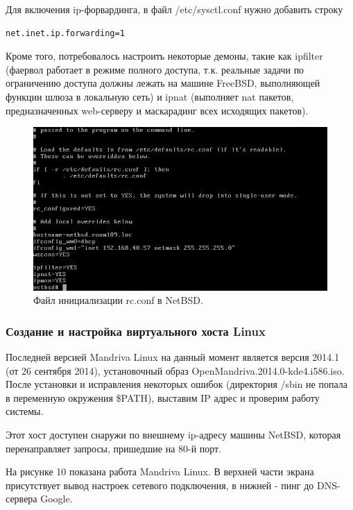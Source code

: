 Для включения ip-форвардинга, в файл /etc/sysctl.conf нужно добавить строку
\begin{Verbatim}[frame=single]
net.inet.ip.forwarding=1
\end{Verbatim}

Кроме того, потребовалось настроить некоторые демоны, такие как ipfilter (фаервол работает в режиме полного доступа, т.к. реальные задачи по ограничению доступа должны лежать на машине FreeBSD, выполняющей функции шлюза в локальную сеть) и ipnat (выполняет nat пакетов, предназначенных web-серверу и маскарадинг всех исходящих пакетов).

\begin{figure}[h!]
\centering
\includegraphics[scale=0.9]{res/netbsd-rcconf}
\caption{Файл инициализации rc.conf в NetBSD.}
\end{figure}

\subsubsection{Создание и настройка виртуального хоста Linux}

Последней версией Mandriva Linux на данный момент является версия 2014.1 (от 26 сентября 2014), установочный образ OpenMandriva.2014.0-kde4.i586.iso. После установки и исправления некоторых ошибок (директория /sbin не попала в переменную окружения \$PATH), выставим IP адрес и проверим работу системы.

Этот хост доступен снаружи по внешнему ip-адресу машины NetBSD, которая перенаправляет запросы, пришедшие на 80-й порт.

На рисунке 10 показана работа Mandriva Linux. В верхней части экрана присутствует вывод настроек сетевого подключения, в нижней - пинг до DNS-сервера Google.

